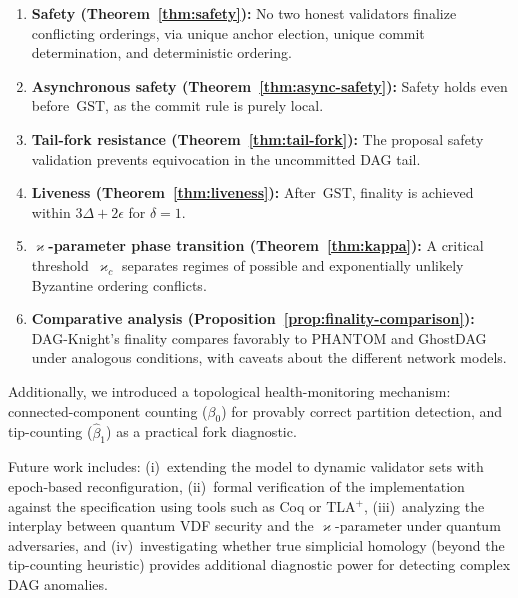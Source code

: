 \documentclass[11pt,a4paper]{article}
\theoremstyle{definition}
\theoremstyle{remark}
\newcommand{\DK}{\textsf{DAG-Knight}}
\newcommand{\GST}{\mathrm{GST}}
\renewcommand{\kappa}{\varkappa}
\begin{document}
\begin{enumerate}[leftmargin=*]
  \item \textbf{Safety (Theorem~\ref{thm:safety}):}
    No two honest validators finalize conflicting orderings, via unique
    anchor election, unique commit determination, and deterministic ordering.

  \item \textbf{Asynchronous safety (Theorem~\ref{thm:async-safety}):}
    Safety holds even before~$\GST$, as the commit rule is purely local.

  \item \textbf{Tail-fork resistance (Theorem~\ref{thm:tail-fork}):}
    The proposal safety validation prevents equivocation in the
    uncommitted DAG tail.

  \item \textbf{Liveness (Theorem~\ref{thm:liveness}):}
    After~$\GST$, finality is achieved within $3\Delta + 2\epsilon$
    for $\delta = 1$.

  \item \textbf{$\kappa$-parameter phase transition (Theorem~\ref{thm:kappa}):}
    A critical threshold~$\kappa_c$ separates regimes of possible and
    exponentially unlikely Byzantine ordering conflicts.

  \item \textbf{Comparative analysis (Proposition~\ref{prop:finality-comparison}):}
    \DK{}'s finality compares favorably to PHANTOM and GhostDAG under
    analogous conditions, with caveats about the different network models.
\end{enumerate}

Additionally, we introduced a topological health-monitoring mechanism:
connected-component counting ($\beta_0$) for provably correct partition
detection, and tip-counting ($\hat{\beta}_1$) as a practical fork
diagnostic.

Future work includes: (i)~extending the model to dynamic validator sets
with epoch-based reconfiguration, (ii)~formal verification of the
implementation against the specification using tools such as Coq or
TLA$^+$, (iii)~analyzing the interplay between quantum VDF security
and the $\kappa$-parameter under quantum adversaries, and
(iv)~investigating whether true simplicial homology (beyond the
tip-counting heuristic) provides additional diagnostic power for
detecting complex DAG anomalies.
\end{document}
